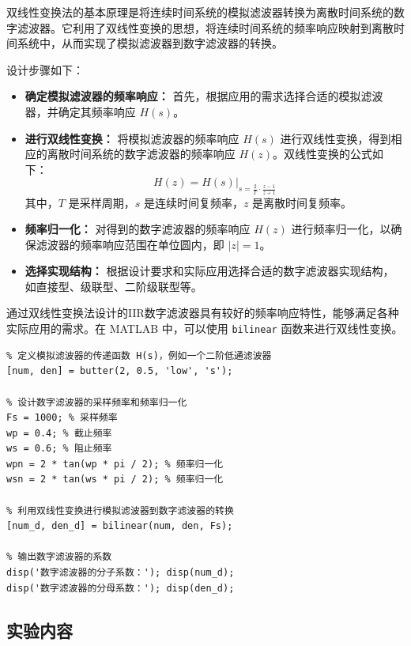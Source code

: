 \documentclass[a4paper,12pt]{article}
\begin{document}
双线性变换法的基本原理是将连续时间系统的模拟滤波器转换为离散时间系统的数字滤波器。它利用了双线性变换的思想，将连续时间系统的频率响应映射到离散时间系统中，从而实现了模拟滤波器到数字滤波器的转换。

设计步骤如下：

\begin{itemize}
    \item \textbf{确定模拟滤波器的频率响应：} 首先，根据应用的需求选择合适的模拟滤波器，并确定其频率响应 \( H(s) \)。
    
    \item \textbf{进行双线性变换：} 将模拟滤波器的频率响应 \( H(s) \) 进行双线性变换，得到相应的离散时间系统的数字滤波器的频率响应 \( H(z) \)。双线性变换的公式如下：
    \[ H(z) = H(s)\bigg|_{s = \frac{2}{T} \cdot \frac{z - 1}{z + 1}} \]
    其中，\( T \) 是采样周期，\( s \) 是连续时间复频率，\( z \) 是离散时间复频率。
    
    \item \textbf{频率归一化：} 对得到的数字滤波器的频率响应 \( H(z) \) 进行频率归一化，以确保滤波器的频率响应范围在单位圆内，即 \( |z| = 1 \)。
    
    \item \textbf{选择实现结构：} 根据设计要求和实际应用选择合适的数字滤波器实现结构，如直接型、级联型、二阶级联型等。
\end{itemize}

通过双线性变换法设计的IIR数字滤波器具有较好的频率响应特性，能够满足各种实际应用的需求。在 MATLAB 中，可以使用 \texttt{bilinear} 函数来进行双线性变换。

\begin{lstlisting}
% 定义模拟滤波器的传递函数 H(s)，例如一个二阶低通滤波器
[num, den] = butter(2, 0.5, 'low', 's');

% 设计数字滤波器的采样频率和频率归一化
Fs = 1000; % 采样频率
wp = 0.4; % 截止频率
ws = 0.6; % 阻止频率
wpn = 2 * tan(wp * pi / 2); % 频率归一化
wsn = 2 * tan(ws * pi / 2); % 频率归一化

% 利用双线性变换进行模拟滤波器到数字滤波器的转换
[num_d, den_d] = bilinear(num, den, Fs);

% 输出数字滤波器的系数
disp('数字滤波器的分子系数：'); disp(num_d);
disp('数字滤波器的分母系数：'); disp(den_d);

\end{lstlisting}

\subsection{实验内容}
\end{document}

